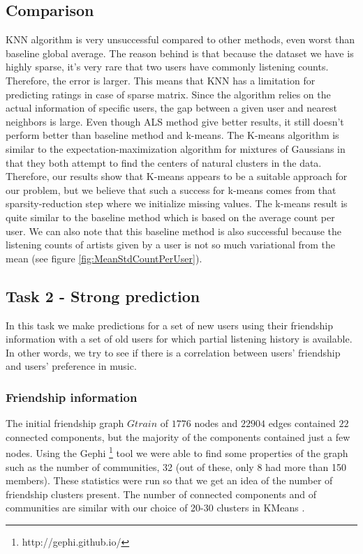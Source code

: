\subsection{Comparison}

KNN algorithm is very unsuccessful compared to other methods, even worst than baseline global average. The reason behind is that because the dataset we have is highly sparse, it’s very rare that two users have commonly listening counts. Therefore, the error is larger. This means that KNN has a limitation for predicting ratings in case of sparse matrix. Since the algorithm relies on the actual information of specific users, the gap between a given user and nearest neighbors is large. Even though ALS method give better results, it still doesn't perform better than baseline method and k-means. The K-means algorithm is similar to the expectation-maximization algorithm for mixtures of Gaussians in that they both attempt to find the centers of natural clusters in the data. Therefore, our results show that K-means appears to be a suitable approach for our problem, but we believe that such a success for k-means comes from that sparsity-reduction step where we initialize missing values. The k-means result is quite similar to the baseline method which is based on the average count per user. We can also note that this baseline method is also successful because the listening counts of artists given by a user is not so much variational from the mean (see figure \ref{fig:MeanStdCountPerUser}).

\subsection{Task 2 - Strong prediction}
In this task we make predictions for a set of new users using their friendship information with a set of old users for which partial listening history is available. In other words, we try to see if there is a correlation between
users' friendship and users' preference in music.

\subsubsection{Friendship information}
The initial friendship graph $Gtrain$ of $1776$ nodes and $22904$ edges contained $22$ connected components, but the majority of the components contained just a few nodes.
Using the Gephi  \footnote{http://gephi.github.io/} tool we were able to find some properties of the graph such as the number of communities, 32 (out of these, only 8  had more than 150 members).
These statistics were run so that we get an idea of the number of friendship clusters present. The number of connected components and of communities are similar with our choice of 20-30 clusters in KMeans .

